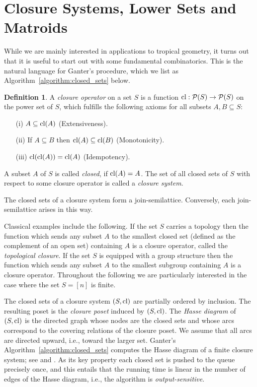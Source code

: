 \documentclass[11pt,a4paper]{amsart}
\theoremstyle{definition}
\newtheorem{definition}{Definition}[section]
\theoremstyle{plain}
\begin{document}
\section{Closure Systems, Lower Sets and Matroids}
\noindent
While we are mainly interested in applications to tropical geometry, it turns out that it is useful to start out with some fundamental combinatorics.
This is the natural language for Ganter's procedure, which we list as Algorithm~\ref{algorithm:closed_sets} below.
\begin{definition}
  A \emph{closure operator} on a set $S$ is a function ${\textnormal{cl}}: \mathcal{P}(S) \to \mathcal{P}(S)$ on the power set of $S$, which fulfills the following axioms for all subsets $A,B\subseteq S$:
 \begin{enumerate}
 \item[(i)] $A \subseteq {\textnormal{cl}}(A)$ (Extensiveness).
 \item[(ii)] If $A \subseteq B$ then ${\textnormal{cl}}(A) \subseteq {\textnormal{cl}}(B)$ (Monotonicity).
 \item[(iii)] ${\textnormal{cl}}({\textnormal{cl}}(A)) = {\textnormal{cl}}(A)$ (Idempotency).
 \end{enumerate}
 A subset $A$ of $S$ is called \emph{closed}, if ${\textnormal{cl}}(A) = A$.
 The set of all closed sets of $S$ with respect to some closure operator is called a \emph{closure system}.
\end{definition}
The closed sets of a closure system form a join-semilattice.
Conversely, each join-semilattice arises in this way.

Classical examples include the following.
If the set $S$ carries a topology then the function which sends any subset $A$ to the smallest closed set (defined as the complement of an open set) containing $A$ is a closure operator, called the \emph{topological closure}.
If the set $S$ is equipped with a group structure then the function which sends any subset $A$ to the smallest subgroup containing $A$ is a closure operator.
Throughout the following we are particularly interested in the case where the set $S=[n]$ is finite.

The closed sets of a closure system $(S,{\textnormal{cl}})$ are partially ordered by inclusion.
The resulting poset is the \emph{closure poset} induced by $(S,{\textnormal{cl}})$.
The \emph{Hasse diagram} of $(S,{\textnormal{cl}})$ is the directed graph whose nodes are the closed sets and whose arcs correspond to the covering relations of the closure poset.
We assume that all arcs are directed upward, i.e., toward the larger set.
Ganter's Algorithm~\ref{algorithm:closed_sets} computes the Hasse diagram of a finite closure system; see \cite{Ganter:1984} and \cite{GanterReuter:1991}.
As its key property each closed set is pushed to the queue precisely once, and this entails that the running time is linear in the number of edges of the Hasse diagram, i.e., the algorithm is \emph{output-sensitive}.
\end{document}
